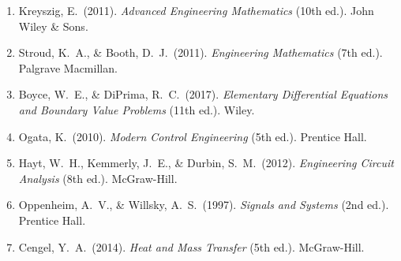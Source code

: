\documentclass[12pt]{article}
\begin{document}
\begin{enumerate}[noitemsep]
  \item Kreyszig, E.\ (2011). \textit{Advanced Engineering Mathematics} (10th ed.). John Wiley \& Sons.
  \item Stroud, K.\ A., \& Booth, D.\ J.\ (2011). \textit{Engineering Mathematics} (7th ed.). Palgrave Macmillan.
  \item Boyce, W.\ E., \& DiPrima, R.\ C.\ (2017). \textit{Elementary Differential Equations and Boundary Value Problems} (11th ed.). Wiley.
  \item Ogata, K.\ (2010). \textit{Modern Control Engineering} (5th ed.). Prentice Hall.
  \item Hayt, W.\ H., Kemmerly, J.\ E., \& Durbin, S.\ M.\ (2012). \textit{Engineering Circuit Analysis} (8th ed.). McGraw-Hill.
  \item Oppenheim, A.\ V., \& Willsky, A.\ S.\ (1997). \textit{Signals and Systems} (2nd ed.). Prentice Hall.
  \item Cengel, Y.\ A.\ (2014). \textit{Heat and Mass Transfer} (5th ed.). McGraw-Hill.
\end{enumerate}
\end{document}
